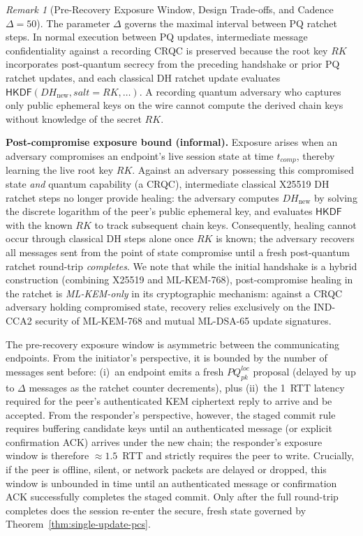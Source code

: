 \documentclass[11pt,a4paper]{article}
\theoremstyle{remark}
\newtheorem{remark}[theorem]{Remark}
\theoremstyle{plain}
\newcommand{\HKDF}{\mathsf{HKDF}}
\begin{document}
\begin{remark}[Pre-Recovery Exposure Window, Design Trade-offs, and Cadence $\Delta = 50$]
\label{rem:delta}
The parameter $\Delta$ governs the maximal interval between PQ ratchet steps.
In normal execution between PQ updates, intermediate message confidentiality against a recording
CRQC is preserved because the root key $RK$ incorporates post-quantum secrecy from the preceding
handshake or prior PQ ratchet updates, and each classical DH ratchet update evaluates
$\HKDF(DH_{\mathrm{new}}, salt = RK, \dots)$.  A recording quantum adversary who captures only public
ephemeral keys on the wire cannot compute the derived chain keys without knowledge of the secret $RK$.

\textbf{Post-compromise exposure bound (informal).}  Exposure arises when an adversary compromises
an endpoint's live session state at time $t_{comp}$, thereby learning the live root key $RK$.  Against
an adversary possessing this compromised state \emph{and} quantum capability (a CRQC), intermediate
classical X25519 DH ratchet steps no longer provide healing: the adversary computes
$DH_{\mathrm{new}}$ by solving the discrete logarithm of the peer's public ephemeral key, and
evaluates $\HKDF$ with the known $RK$ to track subsequent chain keys.  Consequently, healing cannot
occur through classical DH steps alone once $RK$ is known; the adversary recovers all messages sent
from the point of state compromise until a fresh post-quantum ratchet round-trip \emph{completes}.
We note that while the initial handshake is a hybrid construction (combining X25519 and ML-KEM-768),
post-compromise healing in the ratchet is \emph{ML-KEM-only} in its cryptographic mechanism: against a
CRQC adversary holding compromised state, recovery relies exclusively on the IND-CCA2 security of ML-KEM-768
and mutual ML-DSA-65 update signatures.

The pre-recovery exposure window is asymmetric between the communicating endpoints.  From the initiator's perspective, it is bounded by the number of messages sent before:
(i)~an endpoint emits a fresh $PQ^{loc}_{pk}$ proposal (delayed by up to $\Delta$ messages as the
ratchet counter decrements), plus (ii)~the 1~RTT latency required for the peer's
authenticated KEM ciphertext reply to arrive and be accepted.  From the responder's perspective, however, the staged commit rule requires buffering candidate keys until an authenticated message (or explicit confirmation ACK) arrives under the new chain; the responder's exposure window is therefore $\approx 1.5$~RTT and strictly requires the peer to write.  Crucially, if the peer is offline, silent, or
network packets are delayed or dropped, this window is unbounded in time until an authenticated
message or confirmation ACK successfully completes the staged commit.  Only after the full round-trip completes does the session
re-enter the secure, fresh state governed by Theorem~\ref{thm:single-update-pcs}.


\end{remark}
\end{document}
